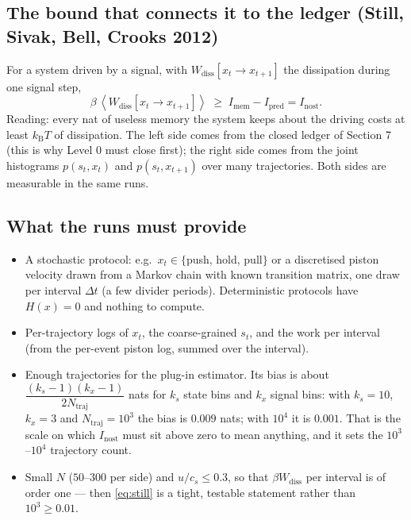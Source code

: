 \documentclass[11pt,a4paper]{article}
\newcommand{\kT}{k_{\mathrm B}T}
\newcommand{\eg}{e.g.\ }
\newcommand{\avg}[1]{\left\langle #1 \right\rangle}
\begin{document}
\subsection{The bound that connects it to the ledger (Still, Sivak, Bell, Crooks 2012)}
For a system driven by a signal, with $W_{\mathrm{diss}}[x_t\to x_{t+1}]$ the dissipation during one signal step,
\begin{equation}
\boxed{\;\beta\,\avg{W_{\mathrm{diss}}[x_t\to x_{t+1}]} \;\ge\; I_{\mathrm{mem}} - I_{\mathrm{pred}} = I_{\mathrm{nost}}.\;}
\label{eq:still}
\end{equation}
Reading: every nat of useless memory the system keeps about the driving costs at least $\kT$ of dissipation. The left side comes from the closed ledger of Section 7 (this is why Level 0 must close first); the right side comes from the joint histograms $p(s_t,x_t)$ and $p(s_t,x_{t+1})$ over many trajectories. Both sides are measurable in the same runs.

\subsection{What the runs must provide}
\begin{itemize}[nosep]
\item A stochastic protocol: \eg $x_t\in\{$push, hold, pull$\}$ or a discretised piston velocity drawn from a Markov chain with known transition matrix, one draw per interval $\Delta t$ (a few divider periods). Deterministic protocols have $H(x)=0$ and nothing to compute.
\item Per-trajectory logs of $x_t$, the coarse-grained $s_t$, and the work per interval (from the per-event piston log, summed over the interval).
\item Enough trajectories for the plug-in estimator. Its bias is about $\dfrac{(k_s - 1)(k_x - 1)}{2N_{\mathrm{traj}}}$ nats for $k_s$ state bins and $k_x$ signal bins: with $k_s = 10$, $k_x = 3$ and $N_{\mathrm{traj}} = 10^3$ the bias is $0.009$ nats; with $10^4$ it is $0.001$. That is the scale on which $I_{\mathrm{nost}}$ must sit above zero to mean anything, and it sets the $10^3$--$10^4$ trajectory count.
\item Small $N$ ($50$--$300$ per side) and $u/c_s\le0.3$, so that $\beta W_{\mathrm{diss}}$ per interval is of order one --- then \eqref{eq:still} is a tight, testable statement rather than $10^3 \ge 0.01$.
\end{itemize}
\end{document}
